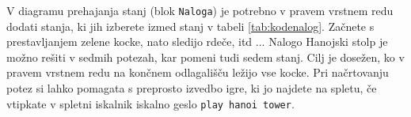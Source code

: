 V diagramu prehajanja stanj (blok \verb"Naloga") je potrebno v pravem vrstnem redu dodati stanja, ki jih izberete izmed stanj v tabeli \ref{tab:kodenalog}. Začnete s prestavljanjem zelene kocke, nato sledijo rdeče, itd ... Nalogo Hanojski stolp je možno rešiti v sedmih potezah, kar pomeni tudi sedem stanj. Cilj je dosežen, ko v pravem vrstnem redu na končnem odlagališču ležijo vse kocke. Pri načrtovanju potez si lahko pomagata s preprosto izvedbo igre, ki jo najdete na spletu, če vtipkate v spletni iskalnik iskalno geslo \verb|play hanoi tower|.